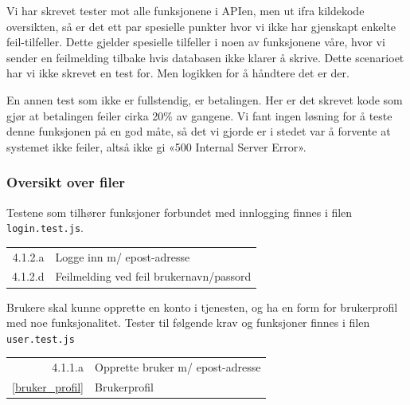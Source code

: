 Vi har skrevet tester mot alle funksjonene i APIen, men ut ifra kildekode oversikten, så er det ett par spesielle punkter hvor vi ikke har gjenskapt enkelte feil-tilfeller. Dette gjelder spesielle tilfeller i noen av funksjonene våre, hvor vi sender en feilmelding tilbake hvis databasen ikke klarer å skrive. Dette scenarioet har vi ikke skrevet en test for. Men logikken for å håndtere det er der. 

En annen test som ikke er fullstendig, er betalingen. Her er det skrevet kode som gjør at betalingen feiler cirka 20\% av gangene. Vi fant ingen løsning for å teste denne funksjonen på en god måte, så det vi gjorde er i stedet var å forvente at systemet ikke feiler, altså ikke gi «500 Internal Server Error». 

\subsubsection{Oversikt over filer}
Testene som tilhører funksjoner forbundet med innlogging finnes i filen \\ \texttt{login.test.js}.

\begin{table}[H]
\centering
\begin{tabularx}{\textwidth}{r|X}
4.1.2.a & Logge inn m/ epost-adresse              \\ 
4.1.2.d & Feilmelding ved feil brukernavn/passord \\ 
\end{tabularx}
\end{table}



Brukere skal kunne opprette en konto i tjenesten, og ha en form for brukerprofil med noe funksjonalitet. Tester til følgende krav og funksjoner finnes i filen \texttt{user.test.js}

\begin{table}[H]
\centering
\begin{tabularx}{\textwidth}{r|X}
4.1.1.a & Opprette   bruker m/ epost-adresse \\
\ref{bruker_profil}  & Brukerprofil                       \\
\end{tabularx}
\end{table}

